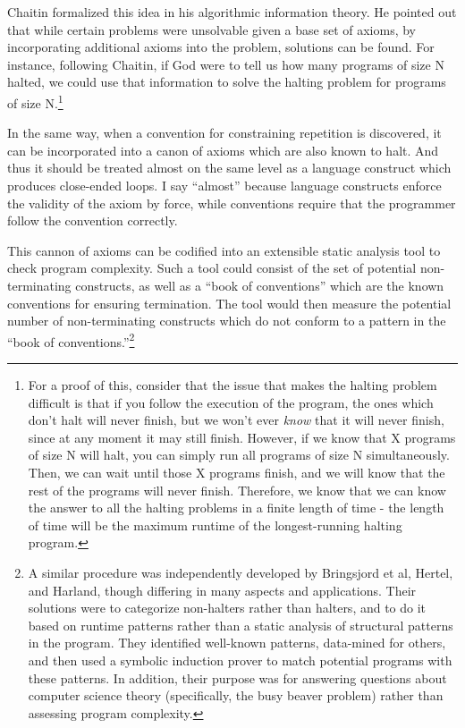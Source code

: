 Chaitin formalized this idea in his algorithmic information theory.  He pointed out that while certain problems were unsolvable given a base set of axioms, by incorporating additional axioms into the problem, solutions can be found.  For instance, following Chaitin, if God were to tell us how many programs of size N halted, we could use that information to solve the halting problem for programs of size N.\cite{chaitin}\footnote{For a proof of this, consider that the issue that makes the halting problem difficult is that if you follow the execution of the program, the ones which don't halt will never finish, but we won't ever \emph{know} that it will never finish, since at any moment it may still finish.  However, if we know that X programs of size N will halt, you can simply run all programs of size N simultaneously.  Then, we can wait until those X programs finish, and we will know that the rest of the programs will never finish.  Therefore, we know that we can know the answer to all the halting problems in a finite length of time - the length of time will be the maximum runtime of the longest-running halting program.}

In the same way, when a convention for constraining repetition is discovered, it can be incorporated into a canon of axioms which are also known to halt.  And thus it should be treated almost on the same level as a language construct which produces close-ended loops.  I say ``almost'' because language constructs enforce the validity of the axiom by force, while conventions require that the programmer follow the convention correctly.

This cannon of axioms can be codified into an extensible static analysis tool to check program complexity.  Such a tool could consist of the set of potential non-terminating constructs, as well as a ``book of conventions'' which are the known conventions for ensuring termination.  The tool would then measure the potential number of non-terminating constructs which do not conform to a pattern in the ``book of conventions.''\footnote{A similar procedure was independently developed by Bringsjord et al\cite{bringsjord}, Hertel\cite{hertel}, and Harland\cite{harland}, though differing in many aspects and applications.  Their solutions were to categorize non-halters rather than halters, and to do it based on runtime patterns rather than a static analysis of structural patterns in the program.  They identified well-known patterns, data-mined for others, and then used a symbolic induction prover to match potential programs with these patterns. In addition, their purpose was for answering questions about computer science theory (specifically, the busy beaver problem) rather than assessing program complexity.}

